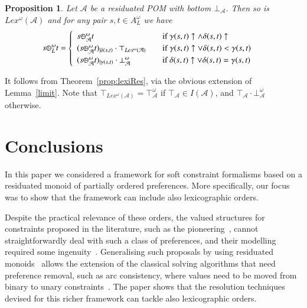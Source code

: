 \documentclass[a4paper]{elsarticle}
\newtheorem{proposition}{Proposition}
\newcommand{\1}{\mathbf{1}}
\def\odiv{{ \ominus\hspace{-8pt}:}\;}
\begin{document}
\begin{proposition}\label{prop:lexiResOmega}
	Let $\mathcal{A}$ be a residuated POM with bottom $\bot_\mathcal{A}$.
	Then so is $Lex^\omega(\mathcal{A})$
	and for any pair $s, t \in A^\omega_L$ we have
	\[
	s \odiv^\omega_L t = 	\begin{cases}
	\begin{array}{lcl}
	s \odiv^\omega_\mathcal{A} t & & \mbox{if  } \gamma(s,t) \uparrow \wedge \delta(s,t) \uparrow \\
	(s \odiv^\omega_\mathcal{A} t)_{\mid \delta(s,t)} \cdot \top_{Lex^\omega(\mathcal{A})} & &  \mbox{if  } \gamma(s,t) \uparrow \vee \delta(s,t) < \gamma(s,t) \\
	(s \odiv^\omega_\mathcal{A} t)_{\mid \gamma(s,t)} \cdot \bot^\omega_\mathcal{A} & & \mbox{if  } \delta(s,t)  \uparrow \vee \delta(s,t) = \gamma(s,t)
	\end{array}
	\end{cases}
	\]
\end{proposition}

It follows from Theorem~\ref{prop:lexiRes}, via the obvious extension of Lemma~\ref{limit}.
Note that $\top_{Lex^\omega(\mathcal{A})} = \top_\mathcal{A}^\omega$
if $\top_\mathcal{A} \in I(\mathcal{A})$, and  $\top_\mathcal{A} \cdot \bot_\mathcal{A}^\omega$ otherwise.

\section{Conclusions}\label{sec:conclusion}
In this paper we considered a framework for soft constraint formalisms based on a residuated monoid of partially ordered preferences.  
%
More specifically, our focus was to show that the framework can include also lexicographic orders.

Despite the practical relevance of these orders, the valued structures for constraints proposed in the literature, 
such as the pioneering~\cite{jacm97,schiex}, cannot straightforwardly deal 
with such a class of preferences, and their modelling required some ingenuity~\cite{GadducciHMW13,valuation}. 
%
Generalising such proposals by using residuated monoids~\cite{residuation1} allows the extension of the classical solving algorithms 
that need preference removal, such as arc consistency, where values need to be moved from binary to unary constraints~\cite{ipl}.
%
The paper shows that the resolution techniques devised for this richer framework can tackle also lexicographic orders.
\end{document}
